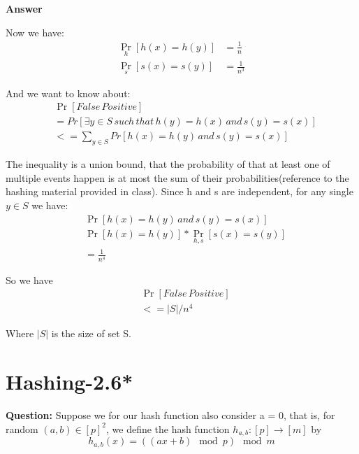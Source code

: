 \documentclass[12pt]{article}
\begin{document}
\textbf{Answer}

Now we have:
\begin{equation}
\begin{aligned}
\mathop{Pr} \limits_{h} [h(x)=h(y)] &= \frac{1}{n}\\
\mathop{Pr} \limits_{s} [s(x)=s(y)] &= \frac{1}{n^3}
\end{aligned}
\end{equation}

And we want to know about:
\begin{equation}
\begin{aligned}
&\mathop{Pr}  [False \, Positive]\\
&= Pr[\exists y \in S \, such \, that \, h(y) = h(x) \, and \, s(y) = s(x)]\\
&<= \sum_{y \in S} Pr[h(x)=h(y) \, and \, s(y)=s(x)]
\end{aligned}
\end{equation}

The inequality is a union bound, that the probability of that at least one of multiple events happen is at most the sum of their probabilities(reference to the hashing material provided in class). Since h and s are independent, for any single $y \in S$ we have:
\begin{equation}
\begin{aligned}
&\mathop{Pr} [h(x)=h(y) \, and \, s(y)=s(x)] \\
&\mathop{Pr} [h(x)=h(y)] * \mathop{Pr} \limits_{h,s} [s(x)=s(y)] \\
&= \frac{1}{n^4}
\end{aligned}
\end{equation}

So we have
\begin{equation}
\begin{aligned}
&\mathop{Pr}  [False \, Positive]\\
&<= |S|/n^4
\end{aligned}
\end{equation}

Where $|S|$ is the size of set S.

\section{Hashing-2.6*}
\textbf{Question:}
Suppose we for our hash function also consider a = 0, that is, for random \((a, b)\in[p]^2\), we define the hash function \(h_{a,b} : [p] \rightarrow [m]\) by
\[h_{a,b}(x) = ((ax + b)\mod{p} )\mod{m}\]
\end{document}
